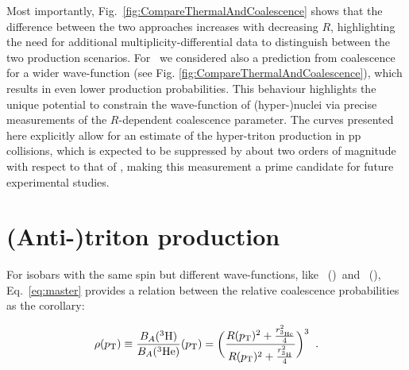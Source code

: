 \documentclass[%
 reprint,
 amsmath,amssymb,
 aps,
]{revtex4-1}
\begin{document}
Most importantly, Fig.~\ref{fig:CompareThermalAndCoalescence} shows that the difference between the two approaches increases with decreasing $R$, highlighting the need for additional multiplicity-differential data to distinguish between the two production scenarios. 
For \hthreelambda~we considered also a prediction from coalescence for a wider wave-function (see Fig. \ref{fig:CompareThermalAndCoalescence}), which results in even lower production probabilities. This behaviour highlights the unique potential to constrain the wave-function of (hyper-)nuclei via precise measurements of the $R$-dependent coalescence parameter. 
The curves presented here explicitly allow for an estimate of the hyper-triton production in pp collisions, which is expected to be suppressed by about two orders of magnitude with respect to that of \hethree, making this measurement a prime candidate for future experimental studies.

\section{(Anti-)triton production}
For isobars with the same spin but different wave-functions, like \tritium~(\antitritium)~and \hethree~(\antihethree), Eq.~\ref{eq:master} provides a relation between the relative coalescence probabilities as the corollary:

\begin{equation} \label{eq:rho}
\rho (p_{\mathrm{T}}) \equiv \frac{B_{A}({}^{3}\mathrm{H})}{B_{A}({}^{3}\mathrm{He})}(p_{\mathrm{T}}) = \bigg( \frac{R(p_{\mathrm{T}})^{2} + \frac{r_{{}^{3}\mathrm{He}}^{2}}{4}} {R(p_{\mathrm{T}})^{2} + \frac{r_{{}^{3}\mathrm{H}}^{2}}{4}} \bigg)^{3} \;\; .
\end{equation}
\end{document}

